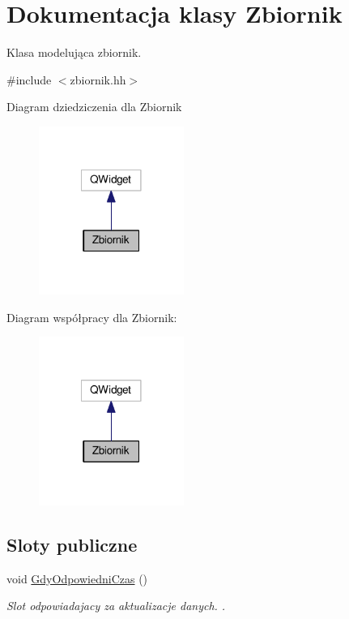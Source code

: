 \hypertarget{class_zbiornik}{\section{Dokumentacja klasy Zbiornik}
\label{class_zbiornik}
}


Klasa modelująca zbiornik.  




{\ttfamily \#include $<$zbiornik.\-hh$>$}



Diagram dziedziczenia dla Zbiornik\nopagebreak
\begin{figure}[H]
\begin{center}
\leavevmode
\includegraphics[width=134pt]{class_zbiornik__inherit__graph}
\end{center}
\end{figure}


Diagram współpracy dla Zbiornik\-:\nopagebreak
\begin{figure}[H]
\begin{center}
\leavevmode
\includegraphics[width=134pt]{class_zbiornik__coll__graph}
\end{center}
\end{figure}
\subsection*{Sloty publiczne}
\begin{DoxyCompactItemize}
\item 
void \hyperlink{class_zbiornik_aa07ceb0fcbf307f0aa1eb75c32f3f47e}{Gdy\-Odpowiedni\-Czas} ()
\begin{DoxyCompactList}\small\item\em Slot odpowiadajacy za aktualizacje danych. . \end{DoxyCompactList}\end{DoxyCompactItemize}
